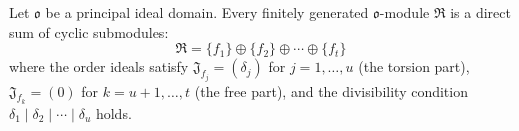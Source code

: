 Let $\mathfrak{o}$ be a principal ideal domain. Every finitely generated $\mathfrak{o}$-module $\mathfrak{R}$ is a direct sum of cyclic submodules:
$$\mathfrak{R} = \{f_1\} \oplus \{f_2\} \oplus \cdots \oplus \{f_t\}$$
where the order ideals satisfy $\mathfrak{J}_{f_j} = (\delta_j)$ for $j = 1, \ldots, u$ (the torsion part), $\mathfrak{J}_{f_k} = (0)$ for $k = u+1, \ldots, t$ (the free part), and the divisibility condition $\delta_1 \mid \delta_2 \mid \cdots \mid \delta_u$ holds.
